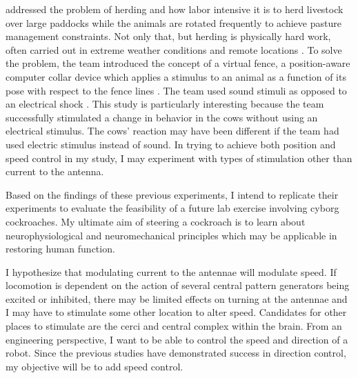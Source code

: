 \citet{Butler2005} addressed the problem of herding and how labor intensive it is to herd livestock over large paddocks while the animals are rotated frequently to achieve pasture management constraints. Not only that, but herding is physically hard work, often carried out in extreme weather conditions and remote locations \citep{Butler2005}. To solve the problem, the team introduced the concept of a virtual fence, a position-aware computer collar device which applies a stimulus to an animal as a function of its pose with respect to the fence lines \citep{Butler2005}. The team used sound stimuli as opposed to an electrical shock \citep{Butler2005}. This study is particularly interesting because the team successfully stimulated a change in behavior in the cows without using an electrical stimulus. The cows' reaction may have been different if the team had used electric stimulus instead of sound. In trying to achieve both position and speed control in my study, I may experiment with types of stimulation other than current to the antenna.



Based on the findings of these previous experiments, I intend to replicate their experiments to evaluate the feasibility of a future lab exercise involving cyborg cockroaches. My ultimate aim of steering a cockroach is to learn about neurophysiological and neuromechanical principles which may be applicable in restoring human function. 

I hypothesize that modulating current to the antennae will modulate speed. If locomotion is dependent on the action of several central pattern generators being excited or inhibited, there may be limited effects on turning at the antennae and I may have to stimulate some other location to alter speed. 
Candidates for other places to stimulate are the cerci and central complex within the brain. From an engineering perspective, I want to be able to control the speed and direction of a robot. Since the previous studies have demonstrated success in direction control, my objective will be to add speed control.







